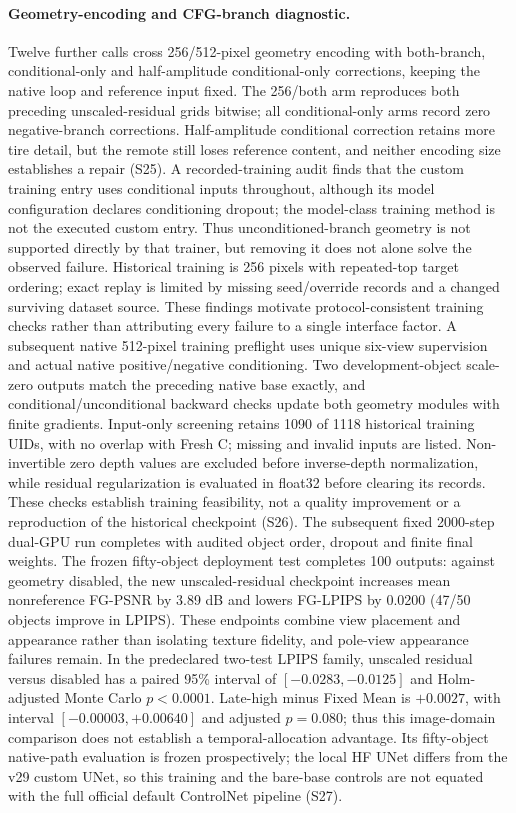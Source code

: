 \paragraph{Geometry-encoding and CFG-branch diagnostic.}
Twelve further calls cross 256/512-pixel geometry encoding with both-branch, conditional-only and half-amplitude conditional-only corrections, keeping the native loop and reference input fixed. The 256/both arm reproduces both preceding unscaled-residual grids bitwise; all conditional-only arms record zero negative-branch corrections. Half-amplitude conditional correction retains more tire detail, but the remote still loses reference content, and neither encoding size establishes a repair (S25). A recorded-training audit finds that the custom training entry uses conditional inputs throughout, although its model configuration declares conditioning dropout; the model-class training method is not the executed custom entry. Thus unconditioned-branch geometry is not supported directly by that trainer, but removing it does not alone solve the observed failure. Historical training is 256 pixels with repeated-top target ordering; exact replay is limited by missing seed/override records and a changed surviving dataset source. These findings motivate protocol-consistent training checks rather than attributing every failure to a single interface factor. A subsequent native 512-pixel training preflight uses unique six-view supervision and actual native positive/negative conditioning. Two development-object scale-zero outputs match the preceding native base exactly, and conditional/unconditional backward checks update both geometry modules with finite gradients. Input-only screening retains 1090 of 1118 historical training UIDs, with no overlap with Fresh C; missing and invalid inputs are listed. Non-invertible zero depth values are excluded before inverse-depth normalization, while residual regularization is evaluated in float32 before clearing its records. These checks establish training feasibility, not a quality improvement or a reproduction of the historical checkpoint (S26). The subsequent fixed 2000-step dual-GPU run completes with audited object order, dropout and finite final weights. The frozen fifty-object deployment test completes 100 outputs: against geometry disabled, the new unscaled-residual checkpoint increases mean nonreference FG-PSNR by 3.89 dB and lowers FG-LPIPS by 0.0200 (47/50 objects improve in LPIPS). These endpoints combine view placement and appearance rather than isolating texture fidelity, and pole-view appearance failures remain. In the predeclared two-test LPIPS family, unscaled residual versus disabled has a paired 95\% interval of $[-0.0283,-0.0125]$ and Holm-adjusted Monte Carlo $p<0.0001$. Late-high minus Fixed Mean is $+0.0027$, with interval $[-0.00003,+0.00640]$ and adjusted $p=0.080$; thus this image-domain comparison does not establish a temporal-allocation advantage. Its fifty-object native-path evaluation is frozen prospectively; the local HF UNet differs from the v29 custom UNet, so this training and the bare-base controls are not equated with the full official default ControlNet pipeline (S27).

